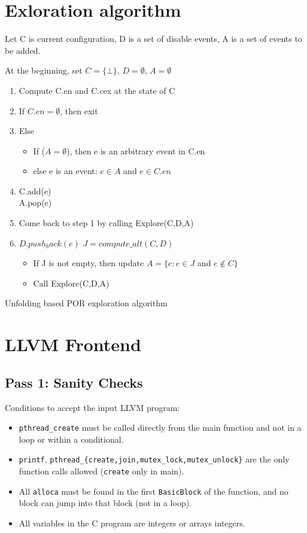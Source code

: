 \documentclass{llncs}
\begin{document}
\section{Exloration algorithm}
\begin{algorithm}
Let C is current configuration, D is a set of disable events, A is a set of events to be added.

At the beginning, set $C = \{\bot \}$, $D = \emptyset$, $A = \emptyset$ 
\begin{enumerate}
	\item
		Compute C.en and C.cex at the state of C
	\item
		If $C.en = \emptyset$, then exit
	\item
		Else 
		\begin{itemize}
			\item
				If ($A = \emptyset$), then e is an arbitrary event in C.en
			\item
				else e is an event: $e \in A$ and $e \in C.en$
		\end{itemize}
	\item
		C.add(e) \\
		A.pop(e)
	\item
		Come back to step 1 by calling Explore(C,D,A)
	\item
		$D.push_back(e)$
		$J = compute\_alt(C,D)$
		\begin{itemize}
			\item
				If J is not empty, then update $A = \{e: e \in J$
				and $e\not\in C\}$
			\item
				Call Explore(C,D,A)
		\end{itemize}
\end{enumerate}

\caption{Unfolding based POR exploration algorithm}
\label{a:reads}	
\end{algorithm}

\section{LLVM Frontend}

\subsection*{Pass 1: Sanity Checks}

Conditions to accept the input LLVM program:

\begin{itemize}
\item
  \verb!pthread_create! must be called directly from the main function and not
  in a loop or within a conditional.
\item
  \verb!printf!,
  \verb!pthread_{create,join,mutex_lock,mutex_unlock}! are the only function calls
  allowed (\verb!create! only in main).
\item
  All \verb!alloca! must be found in the first \verb!BasicBlock! of the
  function, and no block can jump into that block (not in a loop).
\item
  All variables in the C program are integers or arrays integers.
\end{itemize}
\end{document}
